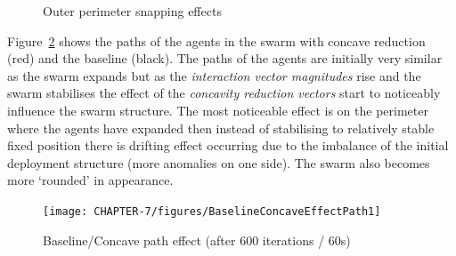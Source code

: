 \begin{figure}[H]
\centering
{}
\caption{Outer perimeter snapping effects}
\label{fig:InducedJitter}
\end{figure}

Figure~\ref{concave:BaselineConcaveEffectPath1} shows the paths of the agents in the swarm with concave reduction (red) and the baseline (black). The paths of the agents are initially very similar as the swarm expands but as the \textit{interaction vector magnitudes} rise and the swarm stabilises the effect of the \textit{concavity reduction vectors} start to noticeably influence the swarm structure. The most noticeable effect is on the perimeter where the agents have expanded then instead of stabilising to relatively stable fixed position there is drifting effect occurring due to the imbalance of the initial deployment structure (more anomalies on one side). The swarm also becomes more `rounded' in appearance. 

\begin{figure}[H]
\begin{center}
\texttt{[image: CHAPTER-7/figures/BaselineConcaveEffectPath1]}
\end{center}
\caption{Baseline/Concave path effect (after 600 iterations / 60s)\label{concave:BaselineConcaveEffectPath1}}
\end{figure}

